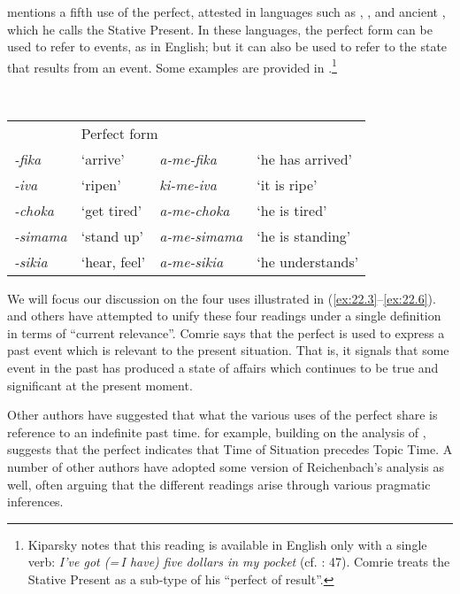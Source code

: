 \citet{Kiparsky2002} mentions a fifth use of the perfect, attested in languages such as , , and ancient , which he calls the Stative Present. In these languages, the perfect form can be used to refer to events, as in English; but it can also be used to refer to the state that results from an event. Some  examples are provided in .\footnote{Kiparsky notes that this reading is available in English only with a single verb: \textit{I’ve got (=\,I have) five dollars in my pocket} (cf. \citealt{Jespersen1931}: 47). Comrie treats the Stative Present as a sub-type of his “perfect of result”.}


\ea \label{ex:22.7}
 \smallskip\\
\begin{tabular}{@{}>{\itshape}ll>{\itshape}ll@{}}
  \multicolumn{2}{l}{Root}  & \multicolumn{2}{l}{Perfect form} \\
-fika & ‘arrive’ & a-me-fika & ‘he has arrived’\\
-iva & ‘ripen’ & ki-me-iva & ‘it is ripe’\\
-choka & ‘get tired’ & a-me-choka & ‘he is tired’\\
-simama & ‘stand up’ & a-me-simama & ‘he is standing’\\
-sikia & ‘hear, feel’ & a-me-sikia & ‘he understands’\\
\end{tabular}
\z
We will focus our discussion on the four uses illustrated in (\ref{ex:22.3}--\ref{ex:22.6}). \citet{Comrie1976} and others have attempted to unify these four readings under a single definition in terms of “current relevance”. Comrie says that the perfect is used to express a past event which is relevant to the present situation. That is, it signals that some event in the past has produced a state of affairs which continues to be true and significant at the present moment.



Other authors have suggested that what the various uses of the perfect share is reference to an indefinite past time. \citet{Klein1992,Klein1994} for example, building on the analysis of \citet{Reichenbach1947}, suggests that the perfect indicates that Time of Situation precedes Topic Time. A number of other authors have adopted some version of Reichenbach’s analysis as well, often arguing that the different readings arise through various pragmatic inferences.



